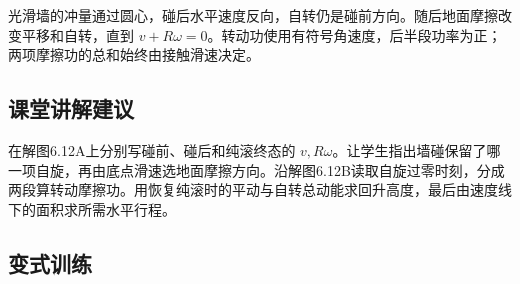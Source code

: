 \documentclass[UTF8,fontset=fandol,a4paper,11pt]{ctexart}
\begin{document}
光滑墙的冲量通过圆心，碰后水平速度反向，自转仍是碰前方向。随后地面摩擦改变平移和自转，直到 $v+R\omega=0$。转动功使用有符号角速度，后半段功率为正；两项摩擦功的总和始终由接触滑速决定。



\subsection*{课堂讲解建议}

在解图6.12A上分别写碰前、碰后和纯滚终态的 $v,R\omega$。让学生指出墙碰保留了哪一项自旋，再由底点滑速选地面摩擦方向。沿解图6.12B读取自旋过零时刻，分成两段算转动摩擦功。用恢复纯滚时的平动与自转总动能求回升高度，最后由速度线下的面积求所需水平行程。




\subsection*{变式训练}
\end{document}
